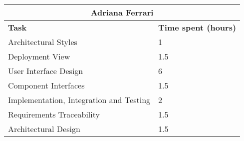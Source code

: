 \begin{table}[H]
  \center
  \begin{tabular}{l|l}
    \multicolumn{2}{c}{\textbf{Adriana Ferrari}} \\
    \hline
    \textbf{Task} & \textbf{Time spent (hours)}\\
    \hline
    Architectural Styles & 1 \\
    Deployment View & 1.5 \\
    User Interface Design & 6 \\
    Component Interfaces & 1.5 \\ 
    Implementation, Integration and Testing & 2 \\
    Requirements Traceability & 1.5 \\
    Architectural Design & 1.5 \\
  \end{tabular}
\end{table}